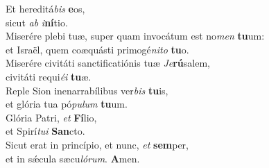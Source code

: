 \oddverse Et hereditá\textit{bis} \textbf{e}os,~\*\\
\oddverse sicut \textit{ab} \textit{i}\textbf{ní}tio.\\
\evenverse Miserére plebi tuæ, super quam invocátum est no\textit{men} \textbf{tu}um:~\*\\
\evenverse et Israël, quem coæquásti primogé\textit{ni}\textit{to} \textbf{tu}o.\\
\oddverse Miserére civitáti sanctificatiónis tuæ \textit{Je}\textbf{rú}salem,~\*\\
\oddverse civitáti requi\textit{é}\textit{i} \textbf{tu}æ.\\
\evenverse Reple Sion inenarrabílibus ver\textit{bis} \textbf{tu}is,~\*\\
\evenverse et glória tua pó\textit{pu}\textit{lum} \textbf{tu}um.\\
\oddverse Glória Patri, \textit{et} \textbf{Fí}lio,~\*\\
\oddverse et Spirí\textit{tu}\textit{i} \textbf{San}cto.\\
\evenverse Sicut erat in princípio, et nunc, \textit{et} \textbf{sem}per,~\*\\
\evenverse et in sǽcula sæcu\textit{ló}\textit{rum}. \textbf{A}men.\\
